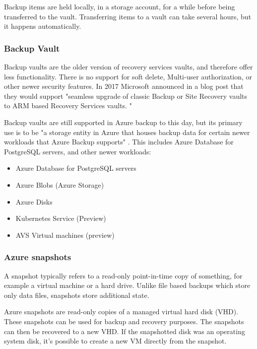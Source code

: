 Backup items are held locally, in a storage account, for a while before being transferred to the vault.
Transferring items to a vault can take several hours, but it happens automatically. 
\subsubsection{Backup Vault}
Backup vaults are the older version of recovery services vaults, and therefore offer less functionality.
There is no support for soft delete, Multi-user authorization, or other newer security features.
In 2017 Microsoft announced in a blog post that they would support "seamless upgrade of classic Backup or Site Recovery vaults to ARM based Recovery Services vaults. " \cite{somendra_upgrade_2017}

Backup vaults are still supported in Azure backup to this day,
but its primary use is to be "a storage entity in Azure that houses backup data for certain newer workloads that Azure Backup supports" \cite{noauthor_overview_nodate}.
This includes Azure Database for PostgreSQL servers, and other newer workloads:

\begin{itemize}
    \item Azure Database for PostgreSQL servers
    \item Azure Blobs (Azure Storage)
    \item Azure Disks
    \item Kubernetes Service (Preview)
    \item AVS Virtual machines (preview)
\end{itemize}

\subsubsection{Azure snapshots}

A snapshot typically refers to a read-only point-in-time copy of something,
for example a virtual machine or a hard drive.
Unlike file based backups which store only data files,
snapshots store additional state. %

Azure snapshots are read-only copies of a managed virtual hard disk (VHD). %
These snapshots can be used for backup and recovery purposes.
The snapshots can then be recovered to a new VHD.
If the snapshotted disk was an operating system disk,
it's possible to create a new VM directly from the snapshot.

